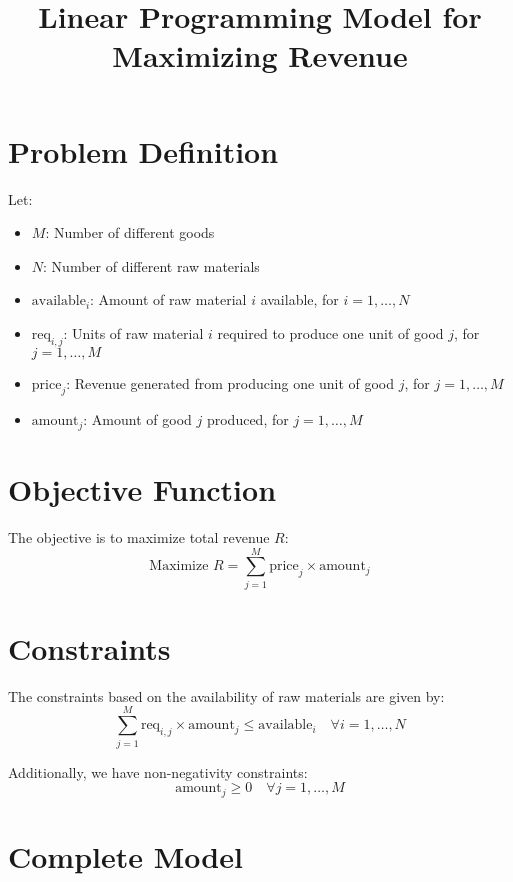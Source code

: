 \documentclass{article}
\begin{document}
\title{Linear Programming Model for Maximizing Revenue}
\author{}
\date{}
\maketitle

\section*{Problem Definition}

Let:
\begin{itemize}
    \item \( M \): Number of different goods
    \item \( N \): Number of different raw materials
    \item \( \text{available}_{i} \): Amount of raw material \( i \) available, for \( i = 1, \ldots, N \)
    \item \( \text{req}_{i,j} \): Units of raw material \( i \) required to produce one unit of good \( j \), for \( j = 1, \ldots, M \)
    \item \( \text{price}_{j} \): Revenue generated from producing one unit of good \( j \), for \( j = 1, \ldots, M \)
    \item \( \text{amount}_{j} \): Amount of good \( j \) produced, for \( j = 1, \ldots, M \)
\end{itemize}

\section*{Objective Function}

The objective is to maximize total revenue \( R \):
\[
\text{Maximize } R = \sum_{j=1}^{M} \text{price}_{j} \times \text{amount}_{j}
\]

\section*{Constraints}

The constraints based on the availability of raw materials are given by:
\[
\sum_{j=1}^{M} \text{req}_{i,j} \times \text{amount}_{j} \leq \text{available}_{i} \quad \forall i = 1, \ldots, N
\]

Additionally, we have non-negativity constraints:
\[
\text{amount}_{j} \geq 0 \quad \forall j = 1, \ldots, M
\]

\section*{Complete Model}
\end{document}
